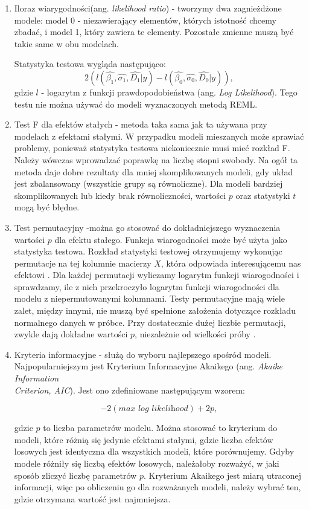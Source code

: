 \documentclass[12pt]{mwbk}
\theoremstyle{plain}
\theoremstyle{definition}
\theoremstyle{remark}
\begin{document}
\begin{enumerate}
	\item Iloraz wiarygodności(ang. \textit{likelihood ratio}) - tworzymy dwa zagnieżdżone modele: model 0 - niezawierający elementów, których istotność chcemy zbadać, i model 1, który zawiera te elementy. Pozostałe zmienne muszą być takie same w obu modelach.
	
	Statystyka testowa wygląda następująco:
	$$2(l(\hat{\beta_1}, \hat{\sigma_1}, \hat{D_1}|y)-l(\hat{\beta_0}, \hat{\sigma_0}, \hat{D_0}|y)),$$
	gdzie $l$ - logarytm z funkcji prawdopodobieństwa (ang. \textit{Log Likelihood}). Tego testu nie można używać do modeli wyznaczonych metodą REML.
	
	\item Test F dla efektów stałych - metoda taka sama jak ta używana przy modelach z efektami stałymi. W przypadku modeli mieszanych może sprawiać problemy, ponieważ statystyka testowa niekoniecznie musi mieć rozkład F. Należy wówczas wprowadzać poprawkę na liczbę stopni swobody. Na ogół ta metoda daje dobre rezultaty dla mniej skomplikowanych modeli, gdy układ jest zbalansowany (wszystkie grupy są równoliczne). Dla modeli bardziej skomplikowanych lub kiedy brak równoliczności, wartości $p$ oraz statystyki $t$ mogą być błędne.
	
	\item Test permutacyjny -można go stosować do dokładniejszego wyznaczenia wartości $p$ dla efektu stałego. Funkcja wiarogodności może być użyta jako statystyka testowa. Rozkład statystyki testowej otrzymujemy wykonując permutacje na tej kolumnie macierzy $X$, która odpowiada interesującemu nas efektowi \cite{biecek}. Dla każdej permutacji wyliczamy logarytm funkcji wiarogodności i sprawdzamy, ile z nich przekroczyło logarytm funkcji wiarogodności dla modelu z niepermutowanymi kolumnami. Testy permutacyjne mają wiele zalet, między innymi, nie muszą być spełnione założenia dotyczące rozkładu normalnego danych w próbce. Przy dostatecznie dużej liczbie permutacji, zwykle dają dokładne wartości $p$, niezależnie od wielkości próby \cite{bootstrap}.
	


	\item Kryteria informacyjne - służą do wyboru najlepszego spośród modeli. Najpopularniejszym jest Kryterium Informacyjne Akaikego (ang. \textit{Akaike Information \\Criterion, AIC}). Jest ono zdefiniowane następującym wzorem:
	
	$$-2(\textit{max log likelihood})+ 2p,$$
	
	gdzie $p$ to liczba parametrów modelu. Można stosować to kryterium do modeli, które różnią się jedynie efektami stałymi, gdzie liczba efektów losowych jest identyczna dla wszystkich modeli, które porównujemy. Gdyby modele różniły się liczbą efektów losowych, należałoby rozważyć, w jaki sposób zliczyć liczbę parametrów $p$. Kryterium Akaikego jest miarą utraconej informacji, więc po obliczeniu go dla rozważanych modeli, należy wybrać ten, gdzie otrzymana wartość jest najmniejsza.

\end{enumerate}
\end{document}
